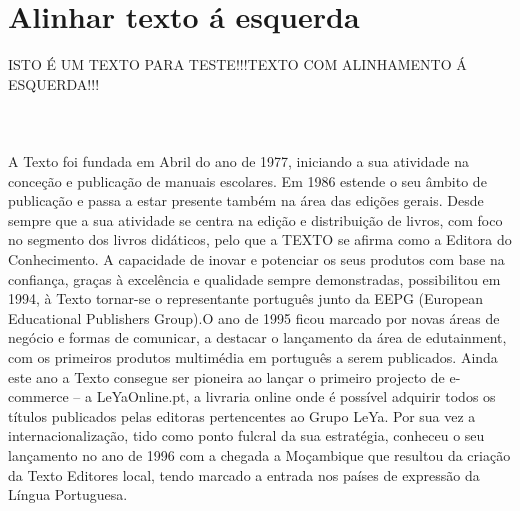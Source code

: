 \documentclass[a4paper,11pt]{article}%
\begin{document}
\section{Alinhar texto á esquerda}
\begin{flushleft}
ISTO É UM TEXTO PARA TESTE!!!\newline TEXTO COM ALINHAMENTO Á ESQUERDA!!!\newline \paragraph{\ \ }
A Texto foi fundada em Abril do ano de 1977, iniciando a sua atividade na conceção e publicação de manuais escolares. Em 1986 estende o seu âmbito de publicação e passa a estar presente também na área das edições gerais. Desde sempre que a sua atividade se centra na edição e distribuição de livros, com foco no segmento dos livros didáticos, pelo que a TEXTO se afirma como a Editora do Conhecimento. A capacidade de inovar e potenciar os seus produtos com base na confiança, graças à excelência e qualidade sempre demonstradas, possibilitou em 1994, à Texto tornar-se o representante português junto da EEPG (European Educational Publishers Group).O ano de 1995 ficou marcado por novas áreas de negócio e formas de comunicar, a destacar o lançamento da área de edutainment, com os primeiros produtos multimédia em português a serem publicados. Ainda este ano a Texto consegue ser pioneira ao lançar o primeiro projecto de e-commerce – a LeYaOnline.pt, a livraria online onde é possível adquirir todos os títulos publicados pelas editoras pertencentes ao Grupo LeYa. Por sua vez a internacionalização, tido como ponto fulcral da sua estratégia, conheceu o seu lançamento no ano de 1996 com a chegada a Moçambique que resultou da criação da Texto Editores local, tendo marcado a entrada nos países de expressão da Língua Portuguesa.
\end{flushleft}


\newpage
\end{document}
